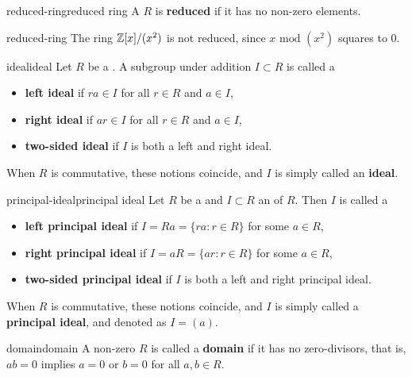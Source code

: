 \begin{topic}{reduced-ring}{reduced ring}
    A  $R$ is \textbf{reduced} if it has no non-zero  elements.
\end{topic}

\begin{example}{reduced-ring}
    The ring $\mathbb{Z}[x] / (x^2)$ is not reduced, since $x \text{ mod } (x^2)$ squares to $0$.
\end{example}

\begin{topic}{ideal}{ideal}
    Let $R$ be a . A subgroup under addition $I \subset R$ is called a
    \begin{itemize}
        \item \textbf{left ideal} if $ra \in I$  for all $r \in R$ and $a \in I$,
        \item \textbf{right ideal} if $ar \in I$ for all $r \in R$ and $a \in I$,
        \item \textbf{two-sided ideal} if $I$ is both a left and right ideal.
    \end{itemize}
    When $R$ is commutative, these notions coincide, and $I$ is simply called an \textbf{ideal}.
\end{topic}

\begin{topic}{principal-ideal}{principal ideal}
    Let $R$ be a  and $I \subset R$ an  of $R$. Then $I$ is called a
    \begin{itemize}
        \item \textbf{left principal ideal} if $I = Ra = \{ ra : r \in R \}$ for some $a \in R$,
        \item \textbf{right principal ideal} if $I = aR = \{ ar : r \in R \}$ for some $a \in R$,
        \item \textbf{two-sided principal ideal} if $I$ is both a left and right principal ideal.
    \end{itemize}
    When $R$ is commutative, these notions coincide, and $I$ is simply called a \textbf{principal ideal}, and denoted as $I = (a)$.
\end{topic}

\begin{topic}{domain}{domain}
    A non-zero  $R$ is called a \textbf{domain} if it has no zero-divisors, that is, $ab = 0$ implies $a = 0$ or $b = 0$ for all $a, b \in R$.
\end{topic}

